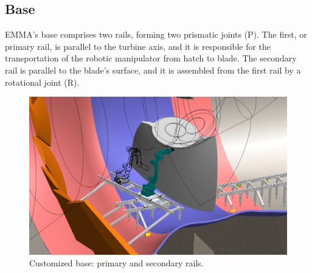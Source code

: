 % 


 

\subsection{Base}

EMMA's base comprises two rails, forming two prismatic joints (P). The
first, or primary rail, is parallel to the turbine axis, and it is responsible
for the transportation of the robotic manipulator from hatch to blade. The
secondary rail is parallel to the blade's surface, and it is assembled from the
first rail by a rotational joint (R).

\begin{figure}
	\centering
	\includegraphics[width=.8\columnwidth]{figs/mecanica/EMMA_Base_Secundaria_01.PNG}
    \caption{Customized base: primary and secondary rails.}
    \label{fig:base}
\end{figure}

